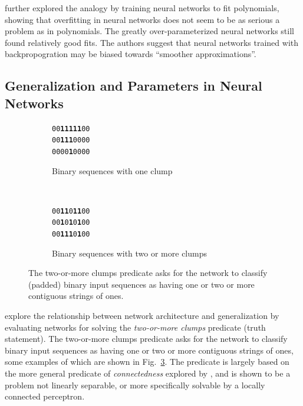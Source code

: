 \documentclass[thesis]{subfiles}
\begin{document}
    \citet{caruana2001overfitting} further explored the analogy by training neural networks to fit polynomials, showing that overfitting in neural networks does not seem to be as serious a problem as in polynomials. The greatly over-parameterized neural networks still found relatively good fits. The authors suggest that neural networks trained with backpropogration may be biased towards ``smoother approximations''.
	
	
	\subsection{Generalization and Parameters in Neural Networks}
	\begin{figure}[tb]
		\centering
		\large
        \renewcommand{\ttdefault}{pcr}
		\begin{subfigure}[t]{0.45\textwidth}
			\begin{center}
			\texttt{00\textbf{11111}00}\\
			\texttt{00\textbf{111}0000}\\
			\texttt{0000\textbf{1}0000}
			\end{center}
			\caption{Binary sequences with one clump}
			\label{fig:oneclump}
		\end{subfigure}
		~
		\begin{subfigure}[t]{0.45\textwidth}
			\begin{center}
			\texttt{00\textbf{11}0\textbf{11}00}\\
			\texttt{00\textbf{1}0\textbf{1}0\textbf{1}00}\\
			\texttt{00\textbf{111}0\textbf{1}00}
			\end{center}
			\caption{Binary sequences with two or more clumps}
			\label{fig:polyfit20th}
		\end{subfigure}
		
        \renewcommand{\ttdefault}{lmodern}
		\caption[Two-or-more Clump Predicate]{The two-or-more clumps predicate asks for the network to classify (padded) binary input sequences as having one or two or more contiguous strings of ones.}
		\label{fig:tomclumps}
	\end{figure}
	
	\citet{denker1987large,giles1987learning} explore the relationship between network architecture and generalization by evaluating networks for solving the \emph{two-or-more clumps} predicate (truth statement). The two-or-more clumps predicate asks for the network to classify binary input sequences as having one or two or more contiguous strings of ones, some examples of which are shown in Fig.~\ref{fig:tomclumps}. The predicate is largely based on the more general predicate of \emph{connectedness} explored by \citet{minsky1988perceptrons}, and is shown to be a problem not linearly separable, or more specifically solvable by a locally connected perceptron. 
	
\end{document}
